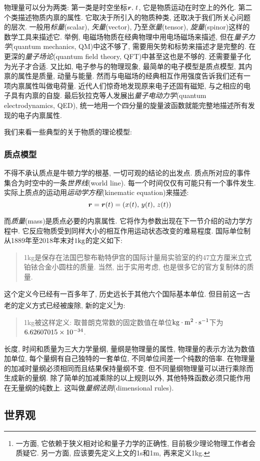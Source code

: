 物理量可以分为两类: 第一类是时空坐标$\boldsymbol{r},\,t$, 它是物质运动在时空上的外化. 第二个类描述物质内禀的属性. 它取决于所引入的物质种类, 还取决于我们所关心问题的层次. 一般用\emph{标量}(scalar), \emph{矢量}(vector), 乃至\emph{张量}(tensor), \emph{旋量}(spinor)这样的数学工具来描述它. 举例, 电磁场物质在经典物理中用电场磁场来描述, 但在\emph{量子力学}(quantum mechanics,  QM)中这不够了, 需要用矢势和标势来描述才是完整的. 在更深的\emph{量子场论}(quantum field theory,  QFT)中甚至这也是不够的. 还需要量子化为光子才合适. 又比如, 电子参与的物理现象, 最简单的电子模型是质点模型, 其内禀的属性是质量, 动量与能量. 然而与电磁场的经典相互作用强度告诉我们还有一项内禀属性叫做电荷量. 近代人们惊奇地发现原来电子还固有磁矩, 与之相应的电子具有内禀的自旋. 最后狄拉克等人发展出\emph{量子电动力学}(quantum electrodynamics, QED), 统一地用一个四分量的旋量波函数就能完整地描述所有发现的电子内禀属性.


我们来看一些典型的关于物质的理论模型:

\subsubsection{质点模型}

不得不承认质点是牛顿力学的根基, 一切可观的结论的出发点. 质点所对应的事件集合为时空中的一条\emph{世界线}(world line). 每一个时间仅仅有可能只有一个事件发生. 实际上质点的运动用\emph{运动学方程}(kinematic equation)来描述:
\[\boldsymbol{r}=\boldsymbol{r}(t)=\left(x(t),\,y(t),\,z(t)\right)\]

而\emph{质量}(mass)是质点必要的内禀属性. 它将作为参数出现在下一节介绍的动力学方程中. 它反应物质受到同样大小的相互作用运动状态改变的难易程度. 国际单位制从1889年至2018年末对$1\rm kg$的定义如下:

\begin{verse}
1kg是保存在法国巴黎布勒特伊宫的国际计量局实验室的约47立方厘米立式铂铱合金小圆柱的质量. 当然, 出于实用考虑, 也是很多它的官方复制体的质量.
\end{verse}

这个定义今已经有一百多年了, 历史远长于其他六个国际基本单位. 但目前这一古老的定义方式已经被废除, 新的定义\footnote{一方面, 它依赖于狭义相对论和量子力学的正确性, 目前极少理论物理工作者会质疑它. 另一方面, 应该要先定义上文的1s和1m, 再来定义1kg.}为:

\begin{verse}
1kg被这样定义: 取普朗克常数的固定数值在单位$\rm kg\cdot m^2\cdot s^{-1}$下为$\rm 6.62607015\times 10^{-34}$.
\end{verse}

长度, 时间和质量为三大力学量纲, 量纲是物理量的属性, 物理量的表示方法为数值加单位, 每个量纲有自己独特的一套单位, 不同单位间差一个纯数的倍率. 在物理量的加减时量纲必须相同而且结果保持量纲不变. 但不同量纲物理量可以进行乘除而生成新的量纲. 除了简单的加减乘除的以上规则以外, 其他特殊函数必须只能作用在无量纲的纯数上. 这叫做\emph{量纲法则}(dimensional rules).




\subsection{世界观}\label{2-1-3}